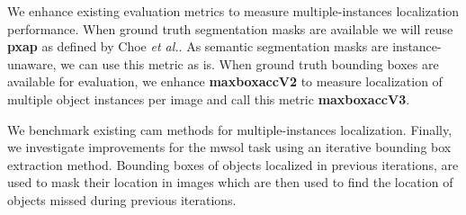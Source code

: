 We enhance existing evaluation metrics \cite{choe2020evaluating} to measure multiple-instances localization performance. When ground truth segmentation masks are available we will reuse \textbf{\acrshort{pxap}} as defined by Choe \textit{et al.}. As semantic segmentation masks are instance-unaware, we can use this metric as is. When ground truth bounding boxes are available for evaluation, we enhance \textbf{\acrshort{maxboxacc}V2} to measure localization of multiple object instances per image and call this metric \textbf{\acrshort{maxboxacc}V3}. 

We benchmark existing \acrshort{cam} methods for multiple-instances localization. Finally, we investigate improvements for the \acrshort{mwsol} task using an iterative bounding box extraction method. Bounding boxes of objects localized in previous iterations, are used to mask their location in images which are then used to find the location of objects missed during previous iterations.